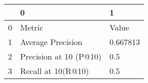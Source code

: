 \begin{tabular}{lll}
\toprule
{} &                       0 &         1 \\
\midrule
0 &                  Metric &     Value \\
1 &       Average Precision &  0.667813 \\
2 &  Precision at 10 (P@10) &       0.5 \\
3 &      Recall at 10(R@10) &       0.5 \\
\bottomrule
\end{tabular}
